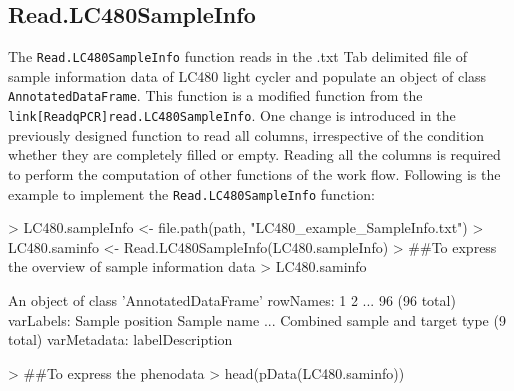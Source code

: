 \documentclass[11pt]{article}
\newcommand{\code}[1]{{\tt #1}}
\begin{document}
\subsection{Read.LC480SampleInfo} 
The \code{Read.LC480SampleInfo} function reads in the .txt Tab delimited file of sample information data of LC480 light cycler and populate an object of class \code{AnnotatedDataFrame}. This function is a modified function from the \code{link[ReadqPCR]{read.LC480SampleInfo}}. One change is introduced in the previously designed function to read all columns, irrespective of the condition whether they are completely filled or empty. Reading all the columns is required to perform the computation of other functions of the work flow.
Following is the example to implement the \code{Read.LC480SampleInfo} function:

\begin{Schunk}
\begin{Sinput}
> LC480.sampleInfo <- file.path(path, "LC480_example_SampleInfo.txt")
> LC480.saminfo <- Read.LC480SampleInfo(LC480.sampleInfo)
> ##To express the overview of sample information data
> LC480.saminfo 
\end{Sinput}
\begin{Soutput}
An object of class 'AnnotatedDataFrame'
  rowNames: 1 2 ... 96 (96 total)
  varLabels: Sample position Sample name ... Combined sample and target
    type (9 total)
  varMetadata: labelDescription
\end{Soutput}
\begin{Sinput}
> ##To express the phenodata
> head(pData(LC480.saminfo))
\end{Sinput}
\end{Schunk}
\end{document}
